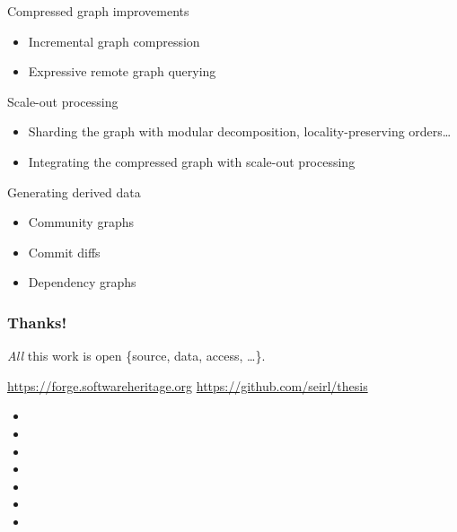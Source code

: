 \documentclass[aspectratio=169,xcolor=table]{beamer}
\begin{document}
\begin{frame}
        \begin{block}{Compressed graph improvements}
            \begin{itemize}
                \item Incremental graph compression
                \item Expressive remote graph querying
            \end{itemize}
        \end{block}
        \begin{block}{Scale-out processing}
            \begin{itemize}
                \item Sharding the graph with modular decomposition,
                    locality-preserving orders…
                \item Integrating the compressed graph with scale-out
                    processing
            \end{itemize}
        \end{block}
        \begin{block}{Generating derived data}
            \begin{itemize}
                \item Community graphs
                \item Commit diffs
                \item Dependency graphs
            \end{itemize}
        \end{block}
    \end{frame}

    \begin{frame}
        \frametitle{Thanks!}

        \begin{block}{}
            \emph{All} this work is open \{source, data, access, …\}.

            \url{https://forge.softwareheritage.org}
            \hfill
            \url{https://github.com/seirl/thesis}
        \end{block}

        \begin{block}{}
            \tiny
            \begin{itemize}
                \item {}
                \item {}
                \item {}
                \item {}
                \item {}
                \item {}
                \item {}
            \end{itemize}
        \end{block}
    \end{frame}
\end{document}
